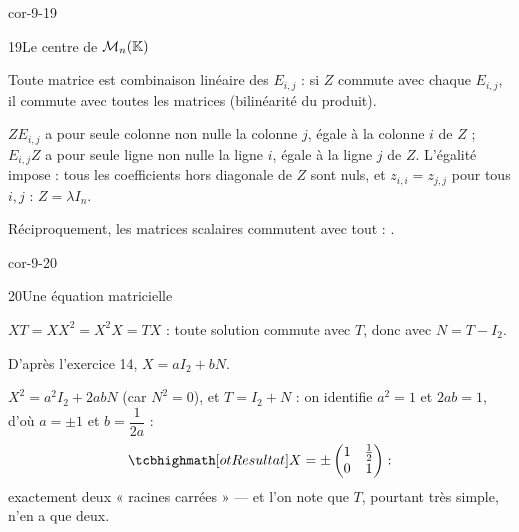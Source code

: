 \begin{blocLivre}{cor-9-19}
\begin{corrige}{19}{Le centre de $\mathcal{M}_n(\mathbb{K})$}
\begin{questions}
  \item Toute matrice est combinaison linéaire des $E_{i,j}$ : si $Z$
    commute avec chaque $E_{i,j}$, il commute avec toutes les matrices
    (bilinéarité du produit).
  \item $ZE_{i,j}$ a pour seule colonne non nulle la colonne $j$, égale à
    la colonne $i$ de $Z$ ; $E_{i,j}Z$ a pour seule ligne non nulle la
    ligne $i$, égale à la ligne $j$ de $Z$. L'égalité impose : tous les
    coefficients hors diagonale de $Z$ sont nuls, et
    $z_{i,i}=z_{j,j}$ pour tous $i,j$ : $Z=\lambda I_n$.
  \item Réciproquement, les matrices scalaires commutent avec tout :
    .
\end{questions}
\end{corrige}
\end{blocLivre}

\begin{blocLivre}{cor-9-20}
\begin{corrige}{20}{Une équation matricielle}
\begin{questions}
  \item $XT=XX^{2}=X^{2}X=TX$ : toute solution commute avec $T$, donc
    avec $N=T-I_2$.
  \item D'après l'exercice 14, $X=aI_2+bN$.
  \item $X^{2}=a^{2}I_2+2abN$ (car $N^{2}=0$), et $T=I_2+N$ : on identifie
    $a^{2}=1$ et $2ab=1$, d'où $a=\pm1$ et $b=\dfrac{1}{2a}$ :
    \[
      \res{X=\pm\begin{pmatrix}1&\tfrac12\\0&1\end{pmatrix}} :
    \]
    exactement deux « racines carrées » — et l'on note que $T$, pourtant
    très simple, n'en a que deux.
\end{questions}
\end{corrige}
\end{blocLivre}

